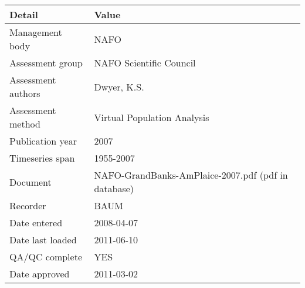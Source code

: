 \begin{table}[htb]
\centering
\begin{tabular}{ll}
\toprule
Detail & Value \\
\midrule
Management body    & NAFO                                                \\
Assessment group   & NAFO Scientific Council                             \\
Assessment authors & Dwyer, K.S.                                         \\
Assessment method  & Virtual Population Analysis                         \\
Publication year   & 2007                                                \\
Timeseries span    & 1955-2007                                           \\
Document           & NAFO-GrandBanks-AmPlaice-2007.pdf (pdf in database) \\
Recorder           & BAUM                                                \\
Date entered       & 2008-04-07                                          \\
Date last loaded   & 2011-06-10                                          \\
QA/QC complete     & YES                                                 \\
Date approved      & 2011-03-02                                          \\
\bottomrule
\end{tabular}
\label{tab:assessdet}
\end{table}
